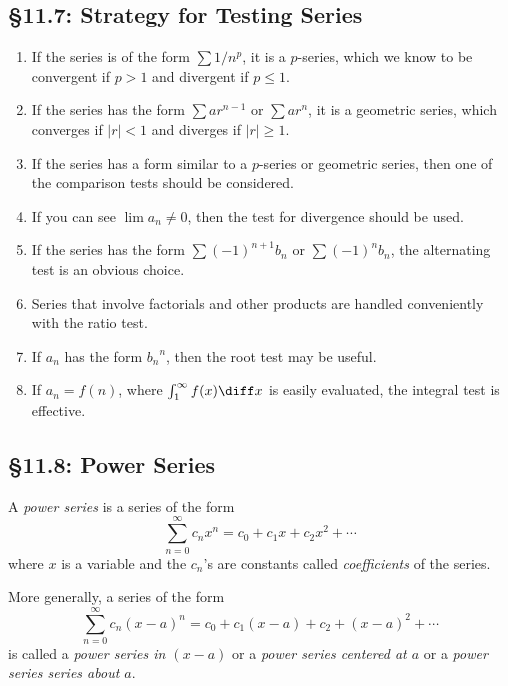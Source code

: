 \subsection*{\S 11.7: Strategy for Testing Series}
\begin{enumerate}[label=\textbf{\roman*.}]
\item If the series is of the form $\sum 1/n^p$, it is a $p$-series, which
  we know to be convergent if $p>1$ and divergent if $p\leq 1$.
\item If the series has the form $\sum ar^{n-1}$ or $\sum ar^n$, it is a
  geometric series, which converges if $|r|<1$ and diverges if $|r|\geq
  1$.
\item If the series has a form similar to a $p$-series or geometric series,
  then one of the comparison tests should be considered.
\item If you can see $\lim a_n\neq 0$, then the test for divergence should
  be used.
\item If the series has the form $\sum(-1)^{n+1} b_n$ or $\sum (-1)^n b_n$,
  the alternating test is an obvious choice.
\item Series that involve factorials and other products are handled
  conveniently with the ratio test.
\item If $a_n$ has the form ${b_n}^n$, then the root test may be useful.
\item If $a_n=f(n)$, where $\int_1^\infty f(x)\diff x$ is easily evaluated,
  the integral test is effective.
\end{enumerate}
\subsection*{\S 11.8: Power Series}
\begin{definition}
A \emph{power series} is a series of the form
\[
\sum_{n=0}^\infty c_nx^n=c_0+c_1x+c_2x^2+\dotsb
\]
where $x$ is a variable and the $c_n$'s are constants called
\emph{coefficients} of the series.
\end{definition}
\begin{definition}
More generally, a series of the form
\[
\sum_{n=0}^\infty c_n(x-a)^n=c_0+c_1(x-a)+c_2+(x-a)^2+\dotsb
\]
is called a \emph{power series in $(x-a)$} or a \emph{power series centered
at $a$} or a \emph{power series series about $a$}.
\end{definition}
\newpage
